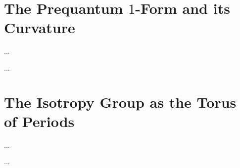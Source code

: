 \section{The Prequantum $1$-Form and its Curvature}
\label{sec:The Prequantum 1-Form and its Curvature}

\begin{article}
  \label{art:existence-prequantum-form}
  ...
\end{article}

\begin{article}
  \label{art:curvature-prequantum-form}
  ...
\end{article}

\section{The Isotropy Group as the Torus of Periods}
\label{sec:The Isotropy Group as the Torus of Periods}

\begin{article}
  \label{art:isotropy-statement}
  ...
\end{article}

\begin{article}
  \label{art:isotropy-subduction}
  ...
\end{article}

